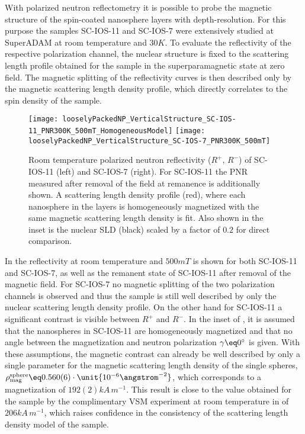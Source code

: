 \documentclass[\main/dresen_thesis.tex]{subfiles}
\begin{document}
  \label{sec:looselyPackedNS:layers:pnr}
  With polarized neutron reflectometry it is possible to probe the magnetic structure of the spin-coated nanosphere layers with depth-resolution.
  For this purpose the samples SC-IOS-11 and SC-IOS-7 were extensively studied at SuperADAM at room temperature and $30 \unit{K}$.
  To evaluate the reflectivity of the respective polarization channel, the nuclear structure is fixed to the scattering length profile obtained for the sample in the superparamagnetic state at zero field.
  The magnetic splitting of the reflectivity curves is then described only by the magnetic scattering length density profile, which directly correlates to the spin density of the sample.

  \begin{figure}[tb]
    \centering
    \texttt{[image: looselyPackedNP\_VerticalStructure\_SC-IOS-11\_PNR300K\_500mT\_HomogeneousModel]}
    \texttt{[image: looselyPackedNP\_VerticalStructure\_SC-IOS-7\_PNR300K\_500mT]}
    \caption{\label{fig:looselyPackedNP:layer:pnrRoomTemperatureMagneticHomModel}Room temperature polarized neutron reflectivity ($R^{+},\, R^{-}$) of SC-IOS-11 (left) and SC-IOS-7 (right). For SC-IOS-11 the PNR measured after removal of the field at remanence is additionally shown. A scattering length density profile (red), where each nanosphere in the layers is homogeneously magnetized with the same magnetic scattering length density is fit. Also shown in the inset is the nuclear SLD (black) scaled by a factor of $0.2$ for direct comparison.}
  \end{figure}
  In  the reflectivity at room temperature and $500 \unit{mT}$ is shown for both SC-IOS-11 and SC-IOS-7, as well as the remanent state of SC-IOS-11 after removal of the magnetic field.
  For SC-IOS-7 no magnetic splitting of the two polarization channels is observed and thus the sample is still well described by only the nuclear scattering length density profile.
  On the other hand for SC-IOS-11 a significant contrast is visible between $R^{+}$ and $R^{-}$.
  In the inset of , it is assumed that the nanospheres in SC-IOS-11 are homogeneously magnetized and that no angle between the magnetization and neutron polarization $\gamma \eq 0 ^\circ$ is given.
  With these assumptions, the magnetic contrast can already be well described by only a single parameter for the magnetic scattering length density of the single spheres, $\rho_\mathrm{mag}^\mathrm{sphere} \eq 0.560(6) \cdot \unit{10^{-6} \angstrom^{-2}}$, which corresponds to a magnetization of $192(2) \unit{kA \, m^{-1}}$.
  This result is close to the value obtained for the sample by the complimentary VSM experiment at room temperature in  of $206 \unit{kA \,m^{-1}}$, which raises confidence in the consistency of the scattering length density model of the sample.
\end{document}
